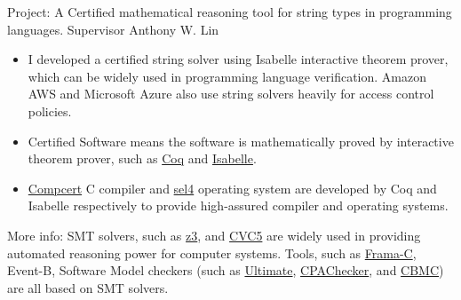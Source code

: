 \documentclass[a4paper,10pt]{memoir} %
\begin{document}


{
Project: A Certified mathematical reasoning tool for string types in programming languages. Supervisor Anthony W. Lin
\begin{itemize}
	
	\item I developed a certified string solver using Isabelle interactive theorem prover, which can be widely used in programming language verification. Amazon AWS and Microsoft Azure also use string solvers heavily for access control policies.

\item Certified Software means the software is mathematically proved by interactive theorem prover, such as \href{https://coq.inria.fr/}{Coq} and \href{https://isabelle.in.tum.de/}{Isabelle}. 
	
\item \href{https://compcert.org/}{Compcert} C compiler and \href{https://sel4.systems/}{sel4} operating system are developed by Coq and Isabelle respectively to provide high-assured compiler and operating systems.



\end{itemize}

More info:
SMT solvers, such as \href{https://github.com/Z3Prover/z3}{z3}, and \href{https://cvc5.github.io/}{CVC5} are widely used in providing automated reasoning power for computer systems. Tools, such as \href{https://frama-c.com/}{Frama-C},  Event-B,  Software Model checkers (such as \href{https://monteverdi.informatik.uni-freiburg.de/tomcat/Website/}{Ultimate}, 
\href{https://cpachecker.sosy-lab.org/}{CPAChecker}, and \href{https://www.cprover.org/cbmc/}{CBMC}) are all based on SMT solvers.
}
\end{document}
